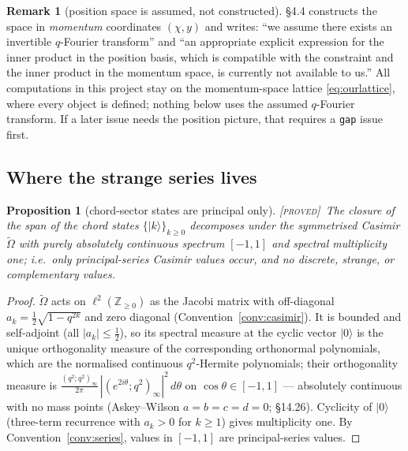 \documentclass[11pt,a4paper]{article}
\newcommand{\PROVED}{{\color{ForestGreen}\textsc{[proved]}}}
\theoremstyle{definition}
\newtheorem{remark}[definition]{Remark}
\theoremstyle{plain}
\newtheorem{proposition}[definition]{Proposition}
\newcommand{\tCas}{\tilde\Omega}                %
\newcommand{\Z}{\mathbb{Z}}
\newcommand{\ket}[1]{|#1\rangle}
\begin{document}
\begin{remark}[position space is assumed, not constructed]\label{rem:positionspace}
\cite{Schouten:2025dssyk} \S4.4 constructs the space in \emph{momentum} coordinates $(\chi,y)$
and writes: ``we assume there exists an invertible $q$-Fourier transform'' and ``an appropriate
explicit expression for the inner product in the position basis, which is compatible with the
constraint and the inner product in the momentum space, is currently not available to us.''
All computations in this project stay on the momentum-space lattice \eqref{eq:ourlattice}, where
every object is defined; nothing below uses the assumed $q$-Fourier transform. If a later issue
needs the position picture, that requires a \texttt{gap} issue first.
\end{remark}

\subsection{Where the strange series lives}
\label{sec:wherestrange}

\begin{proposition}[chord-sector states are principal only]\label{prop:chordprincipal}
\PROVED\ The closure of the span of the chord states $\{\ket{k}\}_{k\ge0}$ decomposes under the
symmetrised Casimir $\tCas$ with purely absolutely continuous spectrum $[-1,1]$ and spectral
multiplicity one; i.e.\ only principal-series Casimir values occur, and no discrete, strange, or
complementary values.
\end{proposition}

\begin{proof}
$\tCas$ acts on $\ell^{2}(\Z_{\ge0})$ as the Jacobi matrix with off-diagonal
$a_{k}=\tfrac12\sqrt{1-q^{2k}}$ and zero diagonal (Convention~\ref{conv:casimir}). It is
bounded and self-adjoint (all $|a_k|\le\tfrac12$), so its spectral measure at the cyclic vector
$\ket{0}$ is the unique orthogonality measure of the corresponding orthonormal polynomials,
which are the normalised continuous $q^{2}$-Hermite polynomials; their orthogonality measure is
$\frac{(q^{2};q^{2})_{\infty}}{2\pi}\,|(e^{2i\theta};q^{2})_{\infty}|^{2}\,d\theta$ on
$\cos\theta\in[-1,1]$ --- absolutely continuous with no mass points (Askey--Wilson $a=b=c=d=0$;
\cite{KLS2010} \S14.26). Cyclicity of $\ket{0}$ (three-term recurrence with $a_{k}>0$ for
$k\ge1$) gives multiplicity one. By Convention~\ref{conv:series}, values in $[-1,1]$ are
principal-series values.
\end{proof}
\end{document}
